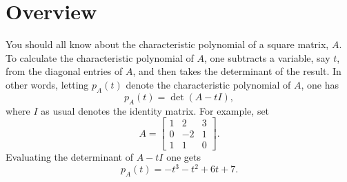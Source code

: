 \documentclass[12pt]{article}
\newcommand{\lb}{\left[}
\newcommand{\rb}{\right]}
\begin{document}

\section{Overview}

You should all know about the characteristic polynomial of a square
matrix, $A$.  To calculate the characteristic polynomial of $A$, one
subtracts a variable, say $t$, from the diagonal entries of $A$, and
then takes the determinant of the result.  In other words, letting
$p_A(t)$ denote the characteristic polynomial of $A$, one has
$$p_A(t) = \det ( A - tI),$$
where $I$ as usual denotes the identity matrix.
 For example, set 
 $$
 A=
 \lb\begin{array}{rrr}
 1 &  2 & 3 \\
 0 & -2 & 1 \\
 1 &  1 & 0 
 \end{array}\rb.$$
 Evaluating the determinant of $A-tI$ one gets 
 $$p_A(t) = -t^3-t^2+6t+7.$$
\end{document}
